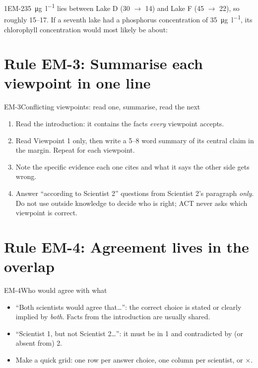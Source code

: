 \documentclass[11pt]{article}
\begin{document}
\begin{q}{1}{EM-2}{\SI{35}{\micro\gram\per\litre} lies between Lake D (30 $\to$ 14) and Lake F (45 $\to$ 22), so roughly 15--17.}
If a seventh lake had a phosphorus concentration of \SI{35}{\micro\gram\per\litre}, its chlorophyll concentration would most likely be about:
\end{q}

\section{Rule EM-3: Summarise each viewpoint in one line}

\begin{rulebox}{EM-3}{Conflicting viewpoints: read one, summarise, read the next}
\begin{enumerate}
\item Read the introduction: it contains the facts \emph{every} viewpoint accepts.
\item Read Viewpoint 1 only, then write a 5--8 word summary of its central claim in the margin. Repeat for each viewpoint.
\item Note the specific evidence each one cites and what it says the other side gets wrong.
\item Answer ``according to Scientist 2'' questions from Scientist 2's paragraph \emph{only}. Do not use outside knowledge to decide who is right; ACT never asks which viewpoint is correct.
\end{enumerate}
\end{rulebox}

\section{Rule EM-4: Agreement lives in the overlap}

\begin{rulebox}{EM-4}{Who would agree with what}
\begin{itemize}
\item ``Both scientists would agree that\ldots'': the correct choice is stated or clearly implied by \emph{both}. Facts from the introduction are usually shared.
\item ``Scientist 1, but not Scientist 2\ldots'': it must be in 1 and contradicted by (or absent from) 2.
\item Make a quick grid: one row per answer choice, one column per scientist, \checkmark{} or $\times$.
\end{itemize}
\end{rulebox}
\end{document}
